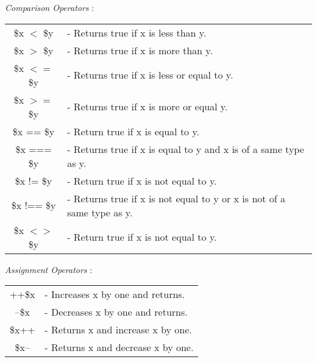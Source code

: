 \documentclass{article}
\begin{document}
\vspace{.5cm}
\hfill\newline
\textit{Comparison Operators} : \\
\begin{tabular}{c l}
\hspace{1cm} \$x $<$ \$y & - Returns true if x is less than y.\\
\hspace{1cm} \$x $>$ \$y & - Returns true if x is more than y.\\
\hspace{1cm} \$x $<=$ \$y & - Returns true if x is less or equal to y.\\
\hspace{1cm} \$x $>=$ \$y & - Returns true if x is more or equal y.\\
\hspace{1cm} \$x == \$y & - Return true if x is equal to y.\\
\hspace{1cm} \$x === \$y & - Returns true if x is equal to y and x is
of a same type as y.\\
\hspace{1cm} \$x != \$y & - Return true if x is not equal to y.\\
\hspace{1cm} \$x !== \$y & - Returns true if x is not equal to y or x is
not of a same type as y.\\
\hspace{1cm} \$x $<>$ \$y & - Return true if x is not equal to y.\\
\end{tabular}
\vspace{.5cm}
\hfill\newline
\textit{Assignment Operators} : \\
\begin{tabular}{c l}
\hspace{1cm} ++\$x & - Increases x by one and returns. \\
\hspace{1cm} --\$x & - Decreases x by one and returns.\\
\hspace{1cm} \$x++ & - Returns x and increase x by one.\\
\hspace{1cm} \$x-- & - Returns x and decrease x by one.\\
\end{tabular}
\vspace{.5cm}
\hfill\newline
\end{document}
